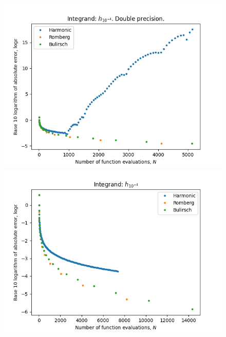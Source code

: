 \begin{figure}[H]
\centering
\begin{minipage}{0.45\textwidth}
\centering
\includegraphics[scale=0.45]{../results/romberg_plots/h_tenthousandth.png}
\end{minipage}
\begin{minipage}{0.45\textwidth}
\centering
\includegraphics[scale=0.45]{../results/romberg_plots/h_tenthousandth_hp.png}
\end{minipage}
\end{figure}

